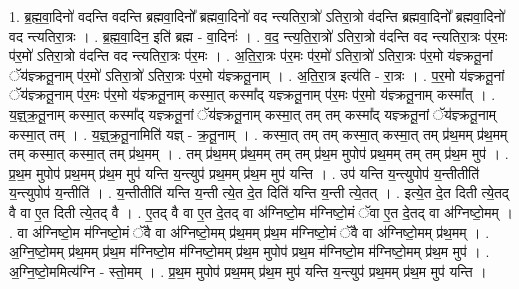 \documentclass[17pt]{extarticle}
\begin{document}
1. ब्र॒ह्म॒वा॒दिनो॑ वदन्ति वदन्ति ब्रह्मवा॒दिनो᳚ ब्रह्मवा॒दिनो॑ वद न्त्यतिरा॒त्रो॑ ऽतिरा॒त्रो व॑दन्ति ब्रह्मवा॒दिनो᳚ ब्रह्मवा॒दिनो॑ वद न्त्यतिरा॒त्रः । . ब्र॒ह्म॒वा॒दिन॒ इति॑ ब्रह्म - वा॒दिनः॑ । . व॒द॒ न्त्य॒ति॒रा॒त्रो॑ ऽतिरा॒त्रो व॑दन्ति वद न्त्यतिरा॒त्रः प॑र॒मः प॑र॒मो॑ ऽतिरा॒त्रो व॑दन्ति वद न्त्यतिरा॒त्रः प॑र॒मः । . अ॒ति॒रा॒त्रः प॑र॒मः प॑र॒मो॑ ऽतिरा॒त्रो॑ ऽतिरा॒त्रः प॑र॒मो य॑ज्ञ्क्रतू॒नां ॅय॑ज्ञ्क्रतू॒नाम् प॑र॒मो॑ ऽतिरा॒त्रो॑ ऽतिरा॒त्रः प॑र॒मो य॑ज्ञ्क्रतू॒नाम् । . अ॒ति॒रा॒त्र इत्य॑ति - रा॒त्रः । . प॒र॒मो य॑ज्ञ्क्रतू॒नां ॅय॑ज्ञ्क्रतू॒नाम् प॑र॒मः प॑र॒मो य॑ज्ञ्क्रतू॒नाम् कस्मा॒त् कस्मा᳚द् यज्ञ्क्रतू॒नाम् प॑र॒मः प॑र॒मो य॑ज्ञ्क्रतू॒नाम् कस्मा᳚त् । . य॒ज्ञ्॒क्र॒तू॒नाम् कस्मा॒त् कस्मा᳚द् यज्ञ्क्रतू॒नां ॅय॑ज्ञ्क्रतू॒नाम् कस्मा॒त् तम् तम् कस्मा᳚द् यज्ञ्क्रतू॒नां ॅय॑ज्ञ्क्रतू॒नाम् कस्मा॒त् तम् । . य॒ज्ञ्॒क्र॒तू॒नामिति॑ यज्ञ् - क्र॒तू॒नाम् । . कस्मा॒त् तम् तम् कस्मा॒त् कस्मा॒त् तम् प्र॑थ॒मम् प्र॑थ॒मम् तम् कस्मा॒त् कस्मा॒त् तम् प्र॑थ॒मम् । . तम् प्र॑थ॒मम् प्र॑थ॒मम् तम् तम् प्र॑थ॒म मुपोप॑ प्रथ॒मम् तम् तम् प्र॑थ॒म मुप॑ । . प्र॒थ॒म मुपोप॑ प्रथ॒मम् प्र॑थ॒म मुप॑ यन्ति य॒न्त्युप॑ प्रथ॒मम् प्र॑थ॒म मुप॑ यन्ति । . उप॑ यन्ति य॒न्त्युपोप॑ य॒न्तीतीति॑ य॒न्त्युपोप॑ य॒न्तीति॑ । . य॒न्तीतीति॑ यन्ति य॒न्ती त्ये॒त दे॒त दिति॑ यन्ति य॒न्ती त्ये॒तत् । . इत्ये॒त दे॒त दिती त्ये॒तद् वै वा ए॒त दिती त्ये॒तद् वै । . ए॒तद् वै वा ए॒त दे॒तद् वा अ॑ग्निष्टो॒म म॑ग्निष्टो॒मं ॅवा ए॒त दे॒तद् वा अ॑ग्निष्टो॒मम् । . वा अ॑ग्निष्टो॒म म॑ग्निष्टो॒मं ॅवै वा अ॑ग्निष्टो॒मम् प्र॑थ॒मम् प्र॑थ॒म म॑ग्निष्टो॒मं ॅवै वा अ॑ग्निष्टो॒मम् प्र॑थ॒मम् । . अ॒ग्नि॒ष्टो॒मम् प्र॑थ॒मम् प्र॑थ॒म म॑ग्निष्टो॒म म॑ग्निष्टो॒मम् प्र॑थ॒म मुपोप॑ प्रथ॒म म॑ग्निष्टो॒म म॑ग्निष्टो॒मम् प्र॑थ॒म मुप॑ । . अ॒ग्नि॒ष्टो॒ममित्य॑ग्नि - स्तो॒मम् । . प्र॒थ॒म मुपोप॑ प्रथ॒मम् प्र॑थ॒म मुप॑ यन्ति य॒न्त्युप॑ प्रथ॒मम् प्र॑थ॒म मुप॑ यन्ति । \newline
\end{document}
